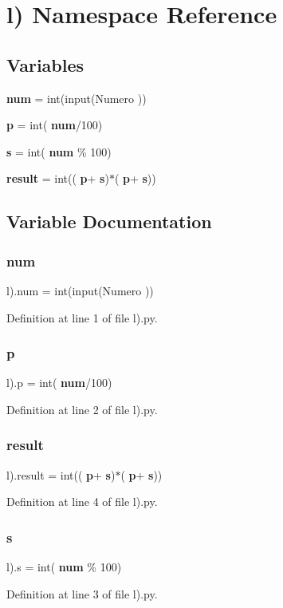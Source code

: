 \section{l) Namespace Reference}
\label{namespacel_08}
\subsection*{Variables}
\begin{DoxyCompactItemize}
\item 
\textbf{ num} = int(input(\textquotesingle{}Numero \textquotesingle{}))
\item 
\textbf{ p} = int(\textbf{ num}/100)
\item 
\textbf{ s} = int(\textbf{ num} \% 100)
\item 
\textbf{ result} = int((\textbf{ p}+\textbf{ s})$\ast$(\textbf{ p}+\textbf{ s}))
\end{DoxyCompactItemize}


\subsection{Variable Documentation}
\mbox{\label{namespacel_08_abfccb2011c551a8a122732612bab9e31}} 
\subsubsection{num}
{\footnotesize\ttfamily l).num = int(input(\textquotesingle{}Numero \textquotesingle{}))}



Definition at line 1 of file l).\+py.

\mbox{\label{namespacel_08_a083b36c56daad0c9d2c3ab7a7db82087}} 
\subsubsection{p}
{\footnotesize\ttfamily l).p = int(\textbf{ num}/100)}



Definition at line 2 of file l).\+py.

\mbox{\label{namespacel_08_a5b50b300401ca10eb9fd6d4262ae112b}} 
\subsubsection{result}
{\footnotesize\ttfamily l).result = int((\textbf{ p}+\textbf{ s})$\ast$(\textbf{ p}+\textbf{ s}))}



Definition at line 4 of file l).\+py.

\mbox{\label{namespacel_08_a6351327421b98884456b9216ddabaea9}} 
\subsubsection{s}
{\footnotesize\ttfamily l).s = int(\textbf{ num} \% 100)}



Definition at line 3 of file l).\+py.

